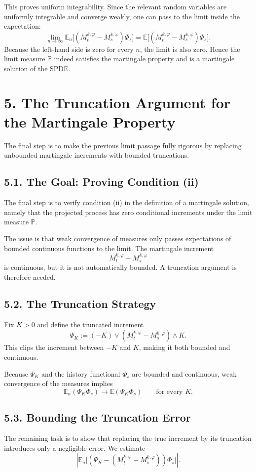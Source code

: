 \documentclass[11pt]{article}
\theoremstyle{definition}
\theoremstyle{remark}
\begin{document}
This proves uniform integrability. Since the relevant random variables are uniformly integrable and converge weakly, one can pass to the limit inside the expectation:
\[
\lim_{n\to\infty}
\mathbb E_n\bigl[(M_t^{k,\varphi}-M_s^{k,\varphi})\Phi_s\bigr]
=
\mathbb E\bigl[(M_t^{k,\varphi}-M_s^{k,\varphi})\Phi_s\bigr].
\]
Because the left-hand side is zero for every \(n\), the limit is also zero. Hence the limit measure \(\mathbb P\) indeed satisfies the martingale property and is a martingale solution of the SPDE.

\section*{5. The Truncation Argument for the Martingale Property}
The final step is to make the previous limit passage fully rigorous by replacing unbounded martingale increments with bounded truncations.

\subsection*{5.1. The Goal: Proving Condition (ii)}
The final step is to verify condition (ii) in the definition of a martingale solution, namely that the projected process has zero conditional increments under the limit measure \(\mathbb P\).

The issue is that weak convergence of measures only passes expectations of bounded continuous functions to the limit. The martingale increment
\[
M_t^{k,\varphi}-M_s^{k,\varphi}
\]
is continuous, but it is not automatically bounded. A truncation argument is therefore needed.

\subsection*{5.2. The Truncation Strategy}
Fix \(K>0\) and define the truncated increment
\[
\Psi_K:=(-K)\vee (M_t^{k,\varphi}-M_s^{k,\varphi})\wedge K.
\]
This clips the increment between \(-K\) and \(K\), making it both bounded and continuous.

Because \(\Psi_K\) and the history functional \(\Phi_s\) are bounded and continuous, weak convergence of the measures implies
\[
\mathbb E_n(\Psi_K\Phi_s)\to \mathbb E(\Psi_K\Phi_s)
\qquad
\text{for every } K.
\]

\subsection*{5.3. Bounding the Truncation Error}
The remaining task is to show that replacing the true increment by its truncation introduces only a negligible error. We estimate
\[
\left|
\mathbb E_n\bigl[(\Psi_K-(M_t^{k,\varphi}-M_s^{k,\varphi}))\Phi_s\bigr]
\right|.
\]
\end{document}
